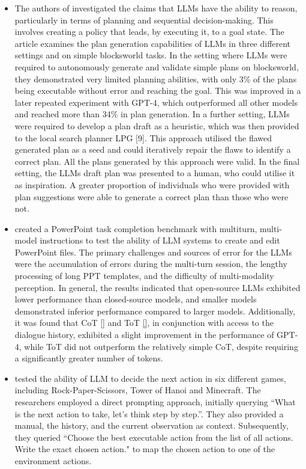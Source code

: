 \documentclass{article}
\begin{document}
\begin{itemize}
	\item The authors of \cite{valmeekam_planning_2023} investigated the claims that LLMs have the ability to reason, particularly in terms of planning and sequential decision-making. This involves creating a policy that leads, by executing it, to a goal state. The article examines the plan generation capabilities of LLMs in three different settings and on simple blocksworld tasks. In the setting where LLMs were required to autonomously generate and validate simple plans on blocksworld, they demonstrated very limited planning abilities, with only 3\% of the plans being executable without error and reaching the goal. This was improved in a later repeated experiment with GPT-4, which outperformed all other models and reached more than 34\% in plan generation. In a further setting, LLMs were required to develop a plan draft as a heuristic, which was then provided to the local search planner LPG [9]. This approach utilised the flawed generated plan as a seed and could iteratively repair the flaws to identify a correct plan. All the plans generated by this approach were  valid. In the final setting, the LLMs draft plan was presented to a human, who could utilise it as inspiration. A greater proportion of individuals who were provided with plan suggestions were able to generate a correct plan than those who were not.
	\item \cite{guo_pptc_2023} created a PowerPoint task completion benchmark with multiturn, multi-model instructions to test the ability of LLM systems to create and edit PowerPoint files. The primary challenges and sources of error for the LLMs were the accumulation of errors during the multi-turn session, the lengthy processing of long PPT templates, and the difficulty of multi-modality perception. In general, the results indicated that open-source LLMs exhibited lower performance than closed-source models, and smaller models demonstrated inferior performance compared to larger models. Additionally, it was found that CoT \ref{} and ToT \ref{}, in conjunction with access to the dialogue history, exhibited a slight improvement in the performance of GPT-4, while ToT did not outperform the relatively simple CoT, despite requiring a significantly greater number of tokens.
	\item \cite{wu_smartplay_2023} tested the ability of LLM to decide the next action in six different games, including Rock-Paper-Scissors, Tower of Hanoi and Minecraft. The researchers employed a direct prompting approach, initially querying “What is the next action to take, let’s think step by step.”. They also provided a manual, the history, and the current observation as context. Subsequently, they queried “Choose the best executable action from the list of all actions. Write the exact chosen action." to map the chosen action to one of the environment actions.

\end{itemize}
\end{document}

